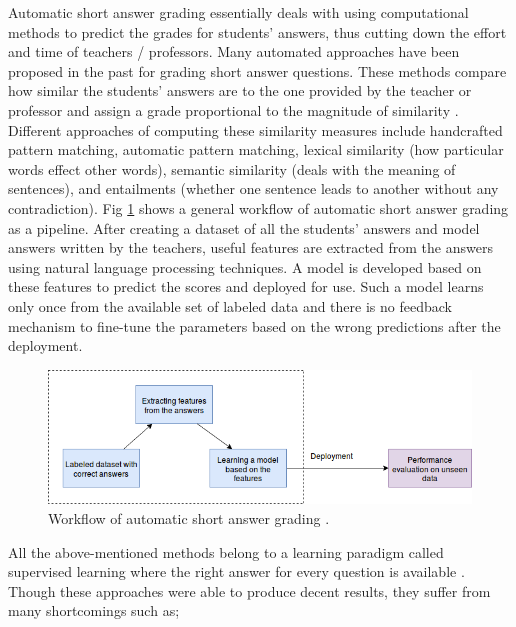 \documentclass[rnd]{mas_proposal}
\begin{document}
Automatic short answer grading essentially deals with using computational methods to predict the grades for students' answers, thus cutting down the effort and time of teachers / professors. Many automated approaches have been proposed in the past for grading short answer questions. These methods compare how similar the students' answers are to the one provided by the teacher or professor and assign a grade proportional to the magnitude of similarity \cite{Mohler2011}. Different approaches of computing these similarity measures include handcrafted pattern matching, automatic pattern matching, lexical similarity (how particular words effect other words), semantic similarity (deals with the meaning of sentences), and entailments (whether one sentence leads to another without any contradiction). Fig \ref{auto_workflow} shows a general workflow of automatic short answer grading as a pipeline. After creating a dataset of all the students' answers and model answers written by the teachers, useful features are extracted from the answers using natural language processing techniques. A model is developed based on these features to predict the scores and deployed for use. Such a model learns only once from the available set of labeled data and there is no feedback mechanism to fine-tune the parameters based on the wrong predictions after the deployment.

\vspace{3mm}

\begin{figure}[h!]
	\includegraphics[width=\textwidth]{images/simpler_model}
	\caption{Workflow of automatic short answer grading \cite{Burrows2015}.}
	\label{auto_workflow}
\end{figure}

All the above-mentioned methods belong to a learning paradigm called supervised learning where the right answer for every question is available \cite{Horbach2016}. Though these approaches were able to produce decent results, they suffer from many shortcomings such as;
\end{document}
